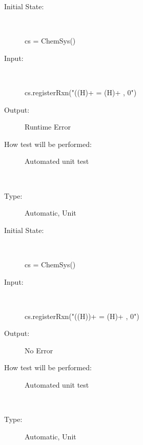 \documentclass[12pt, titlepage]{article}
\newcounter{testnum} %
\begin{document}
\begin{addmargin}[2em]{0em}
\begin{addmargin}[2em]{0em}
\begin{description}
\item[Initial State:] ~\newline

\begin{python}
cs = ChemSys()
\end{python}
					
\item[Input:] ~\newline

\begin{python}
cs.registerRxn("((H)+ = (H)+ , 0") 
\end{python}
					
\item[Output:] Runtime Error
					
\item[How test will be performed:] Automated unit test\\
\end{description}
\end{addmargin}


\\
\begin{addmargin}[2em]{0em}
\begin{description}
\item[Type:] Automatic, Unit
					
\item[Initial State:] ~\newline

\begin{python}
cs = ChemSys()
\end{python}
\newpage					
\item[Input:] ~\newline

\begin{python}
cs.registerRxn("((H))+ = (H)+ , 0") 
\end{python}
					
\item[Output:] No Error
					
\item[How test will be performed:] Automated unit test\\
\end{description}
\end{addmargin}


\\
\begin{addmargin}[2em]{0em}
\begin{description}
\item[Type:] Automatic, Unit
					

\end{description}
\end{addmargin}
\end{addmargin}
\end{document}
